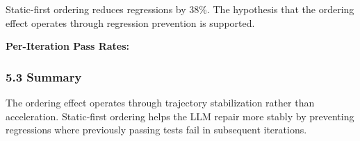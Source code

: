 \begin{table}[htbp]
\centering
{}
\end{table}

Static-first ordering reduces regressions by 38\%. The hypothesis that the ordering effect operates through regression prevention is supported.

\textbf{Per-Iteration Pass Rates:}

\begin{table}[htbp]
\centering
{}
\end{table}

\subsubsection{5.3 Summary}

The ordering effect operates through trajectory stabilization rather than acceleration. Static-first ordering helps the LLM repair more stably by preventing regressions where previously passing tests fail in subsequent iterations.


